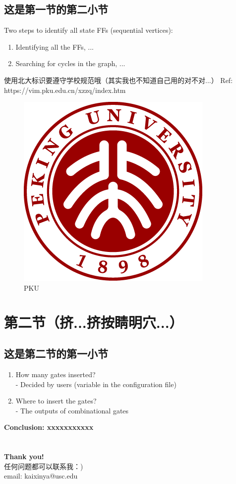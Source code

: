 \documentclass{beamer}
\begin{document}
\subsection{这是第一节的第二小节}
\begin{frame}
\begin{block}{Two steps to identify all state FFs (sequential vertices):}
\begin{enumerate}
\item Identifying all the FFs, ...
\item Searching for cycles in the graph, ... 
\end{enumerate}
\end{block}

\begin{block}{使用北大标识要遵守学校规范哦（其实我也不知道自己用的对不对...）}
Ref: https://vim.pku.edu.cn/xzzq/index.htm
\begin{figure}[H]
\includegraphics[width=0.25\columnwidth]{PKU.png}
\caption{PKU}
\label{PKU}
\end{figure}
\end{block}

\end{frame}


\section{第二节（挤...挤按睛明穴...）}


\subsection{这是第二节的第一小节}
\begin{frame}
\begin{enumerate}[Q1:]
\item How many gates inserted? \\
- Decided by users (variable in the configuration file)
\item Where to insert the gates? \\
- The outputs of combinational gates 
\end{enumerate}
{\bf Conclusion: xxxxxxxxxxx}
\end{frame}


\section{}
\begin{frame}
\begin{center} 
{\bfseries \Large Thank you!} \\
任何问题都可以联系我：) \\
email: kaixinya@usc.edu
\end{center}
\end{frame}


\end{document}
